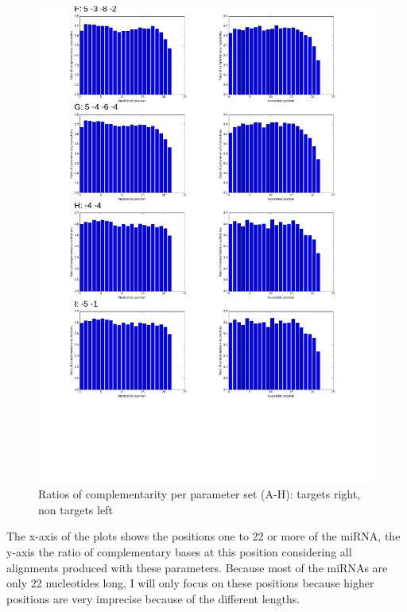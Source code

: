 \documentclass[12pt]{article}
\begin{document}
\begin{figure}
\includegraphics[scale=0.65]{results/compl2.png}
\vspace{-3cm}
\caption{Ratios of complementarity per parameter set (A-H): targets right, non targets left}
\label{ratios}
\end{figure}

The x-axis of the plots shows the positions one to 22 or more of the miRNA, the y-axis the ratio of complementary bases at this position considering all alignments produced with these parameters. Because most of the miRNAs are only 22 nucleotides long, I will only focus on these positions because higher positions are very imprecise because of the different lengths.
\end{document}
